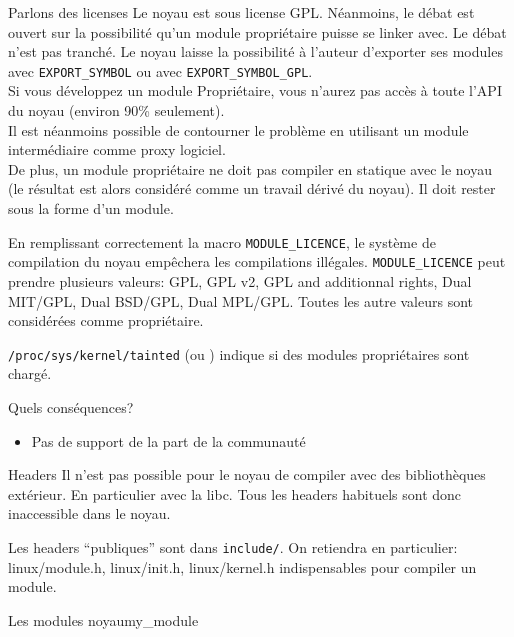 \begin{frame}[fragile=singleslide]{Parlons des licenses}
  Le noyau est sous license GPL. Néanmoins, le débat est ouvert sur la
  possibilité  qu'un module  propriétaire puisse  se linker  avec.  Le
  débat n'est pas  tranché. Le noyau laisse la  possibilité à l'auteur
  d'exporter   ses   modules   avec   \verb+EXPORT_SYMBOL+   ou   avec
  \verb+EXPORT_SYMBOL_GPL+.
\\[2ex]
  Si vous développez un module Propriétaire, vous n'aurez pas accès à
  toute l'API du noyau (environ 90\% seulement).
\\[2ex]
  Il est néanmoins possible de contourner le problème en utilisant un
  module intermédiaire comme proxy logiciel.
\\[2ex]

De plus, un module propriétaire  ne doit pas compiler en statique avec
le noyau (le  résultat est alors considéré comme  un travail dérivé du
noyau). Il doit rester sous la forme d'un module.

  En  remplissant  correctement  la  macro  \verb+MODULE_LICENCE+,  le
  système   de  compilation  du   noyau  empêchera   les  compilations
  illégales.  \verb+MODULE_LICENCE+  peut  prendre plusieurs  valeurs:
  GPL, GPL v2, GPL and additionnal rights, Dual MIT/GPL, Dual BSD/GPL,
  Dual  MPL/GPL.  Toutes  les  autre valeurs  sont  considérées  comme
  propriétaire.

  \verb+/proc/sys/kernel/tainted+ (ou ) indique si des modules propriétaires sont chargé. 
  
  Quels conséquences?
  \begin{itemize} 
  \item Pas de support de la part de la communauté
  \end{itemize} 
\end{frame}

\begin{frame}{Headers}
  Il  n'est  pas   possible  pour  le  noyau  de   compiler  avec  des
  bibliothèques  extérieur.  En particulier  avec  la  libc. Tous  les
  headers habituels sont donc inaccessible dans le noyau.

  Les headers ``publiques'' sont dans \verb+include/+. On retiendra en
  particulier:     linux/module.h,     linux/init.h,    linux/kernel.h
  indispensables pour compiler un module.

\end{frame} 

\begin{frame}[fragile=singleslide]{Les modules noyau}{my\_module}
  
\end{frame}


